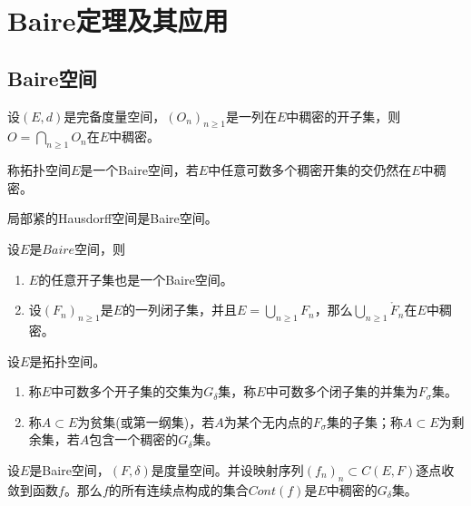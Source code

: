 \section{Baire定理及其应用}
\subsection{Baire空间}

\begin{theorem}[Baire]
    设$(E,d)$是完备度量空间，$(O_n)_{n\geq1}$是一列在$E$中稠密的开子集，则$O=\bigcap_{n\geq1}O_n$在$E$中稠密。
\end{theorem}

\begin{definition}
    称拓扑空间$E$是一个Baire空间，若$E$中任意可数多个稠密开集的交仍然在$E$中稠密。
\end{definition}

\begin{theorem}
    局部紧的Hausdorff空间是Baire空间。
\end{theorem}

\begin{theorem}
    设$E$是$Baire$空间，则
    \begin{enumerate}
        \item $E$的任意开子集也是一个Baire空间。
        \item 设$(F_n)_{n\geq1}$是$E$的一列闭子集，并且$E=\bigcup_{n\geq1}F_n $，那么$\bigcup_{n\geq1}\mathring{F}_n$在$E$中稠密。
    \end{enumerate}
\end{theorem}

\begin{definition}
    设$E$是拓扑空间。
    \begin{enumerate}
        \item 称$E$中可数多个开子集的交集为$G_{\delta}$集，称$E$中可数多个闭子集的并集为$F_{\sigma}$集。
        \item 称$A\subset E$为贫集(或第一纲集)，若$A$为某个无内点的$F_{\sigma }$集的子集；称$A\subset E$为剩余集，若$A$包含一个稠密的$G_{\delta }$集。
    \end{enumerate}
\end{definition}

\begin{theorem}
    设$E$是Baire空间，$(F,\delta )$是度量空间。并设映射序列$(f_n)_n\subset C(E,F)$逐点收敛到函数$f$。那么$f$的所有连续点构成的集合$Cont(f)$是$E$中稠密的$G_{\delta }$集。
\end{theorem}

